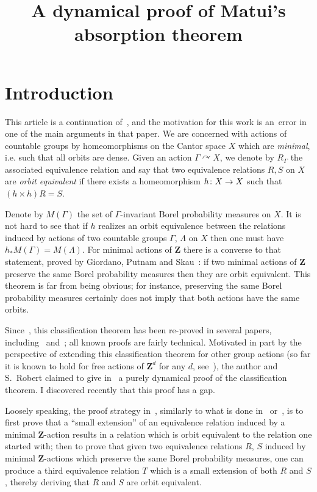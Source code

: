 \documentclass[AHL,Unicode]{cedram}
\title[A dynamical proof of Matui's absorption theorem]{A dynamical proof of Matui's absorption theorem}
\author[\initial{J.} \lastname{Melleray}]{\firstname{Julien} \lastname{Melleray}}
\newcommand{\actson}{\curvearrowright}
\newcommand{\Z}{\mathbf{Z}}
\renewcommand*{\to}{\mathchoice{\longrightarrow}{\rightarrow}{\rightarrow}{\rightarrow}}
\begin{document}
\maketitle

\section{Introduction} 

This article is a continuation of~\cite{Melleray2023}, and the motivation for this work is an~error in one of the main arguments in that paper. We are concerned with actions of countable groups by homeomorphisms on the Cantor space $X$ which are \emph{minimal}, i.e. such that all orbits are dense. Given an action $\Gamma \actson X$, we denote by $R_\Gamma$ the associated equivalence relation and say that two equivalence relations $R,S$ on $X$ are \emph{orbit equivalent} if there exists a homeomorphism $h \colon X \to X$ such that $(h \times h)R=S$.

Denote by $M(\Gamma)$ the set of $\Gamma$-invariant Borel probability measures on $X$. It is not hard to see that if $h$ realizes an orbit equivalence between the relations induced by actions of two countable groups $\Gamma$, $\Lambda$ on $X$ then one must have $h_*M(\Gamma)=M(\Lambda)$. For minimal actions of $\Z$ there is a converse to that statement, proved by Giordano, Putnam and Skau~\cite{Giordano1995}: if two minimal actions of $\Z$ preserve the same Borel probability measures then they are orbit equivalent. This theorem is far from being obvious; for instance, preserving the same Borel probability measures certainly does not imply that both actions have the same orbits.

Since~\cite{Giordano1995}, this classification theorem has been re-proved in several papers, including~\cite{Putnam2010} and~\cite{Keane2011}; all known proofs are fairly technical. Motivated in part by the perspective of extending this classification theorem for other group actions (so far it is known to hold for free actions of $\Z^d$ for any $d$, see~\cite{Giordano2010}), the author and S.~Robert claimed to give in~\cite{Melleray2023} a purely dynamical proof of the classification theorem. I discovered recently that this proof has a gap.

Loosely speaking, the proof strategy in~\cite{Melleray2023}, similarly to what is done in~\cite{Giordano2004} or~\cite{Putnam2010}, is to first prove that a ``small extension'' of an equivalence relation induced by a minimal $\Z$-action results in a relation which is orbit equivalent to the relation one started with; then to prove that given two equivalence relations $R$, $S$ induced by minimal $\Z$-actions which preserve the same Borel probability measures, one can produce a third equivalence relation $T$ which is a small extension of both $R$ and $S$, thereby deriving that $R$ and $S$ are orbit equivalent.
\end{document}
